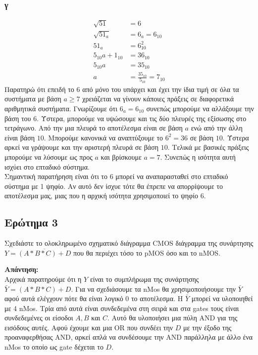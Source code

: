\documentclass[draft]{article}
\begin{document}
\subsubsection{γ}
\begin{align*}
  \sqrt{51} &= 6 \\
  \sqrt{51_a} &= 6_a = 6_{10} \\
  51_a &= 6_{10}^2 \\
  5_{10}a + 1_{10} &= 36_{10} \\
  5_{10}a &= 35_{10} \\
  a &= \frac{35_{10}}{5_{10}} = 7_{10}
\end{align*}
Παρατηρώ ότι επειδή το $6$ από μόνο του υπάρχει και έχει την ίδια τιμή σε όλα τα συστήματα με βάση $a \ge 7$ χρειάζεται να γίνουν κάποιες πράξεις σε διαφορετικά αριθμητικά συστήματα.
Γνωρίζουμε ότι $6_a = 6_{10}$ συνεπώς μπορούμε να αλλάξουμε την βάση του $6$. Ύστερα, μπορούμε να υψώσουμε και τις δύο πλευρές της εξίσωσης στο τετράγωνο. Από την μια πλευρά το αποτέλεσμα είναι σε βάση $a$ ενώ από την άλλη είναι βάση $10$.
Μπορούμε κανονικά να αναπτύξουμε το $6^2 = 36$ σε βάση $10$. Ύστερα αρκεί να γράψουμε και την αριστερή πλευρά σε βάση $10$. Τελικά με βασικές πράξεις μπορούμε να λύσουμε ως προς $a$ και βρίσκουμε $a = 7$.
Συνεπώς η ισότητα αυτή ισχύει στο επταδικό σύστημα. \\ 
Σημαντική παρατήρηση είναι ότι το $6$ μπορεί να αναπαρασταθεί στο επταδικό σύστημα με 1 ψηφίο. Αν αυτό δεν ίσχυε τότε θα έπρεπε να απορρίψουμε το αποτέλεσμα μας, μιας που η αρχική ισότητα χρησιμοποιεί το ψηφίο $6$.

\newpage

\subsection{Ερώτημα 3}
Σχεδιάστε το ολοκληρωμένο σχηματικό διάγραμμα CMOS διάγραμμα της συνάρτησης $Y=\overline{(A * B * C) + D}$ που θα περιέχει τόσο το pMOS όσο και το nMOS.

\textbf{Απάντηση: }\\
Αρχικά παρατηρούμε ότι η $Y$ είναι το συμπλήρωμα της συνάρτησης $\bar{Y} = (A * B * C) + D$.
Για να σχεδιάσουμε τα nMos θα χρησιμοποιήσουμε την $\bar{Y}$ αφού αυτά ελέγχουν πότε θα είναι λογικό 0 το αποτέλεσμα.
Η $\bar{Y}$ μπορεί να υλοποιηθεί με 4 nMos. Τρία από αυτά είναι συνδεδεμένα στη σειρά και στα gates τους είναι συνδεδεμένες οι είσοδοι $A, B$ και $C$.
Αυτό θα υλοποιήσει μια πύλη AND για της εισόδους αυτές. Αφού έχουμε και μια OR που συνδέει την $D$ με την έξοδο της προαναφερθήσας AND,
αρκεί απλά να συνδέσουμε την AND παράλληλα με άλλο ένα nMos το οποίο ως gate δέχεται το $D$.
\end{document}
